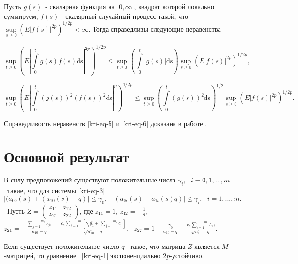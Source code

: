 \begin{lemma}
Пусть  $g(s)$\ {}- скалярная функция на  $[0,\infty [$, квадрат которой локально суммируем,
$f(s)$ {}- скалярный случайный процесс такой, что  $\underset{s\ge 0} \sup \left(E|f(s)|^{2p}\right)^{1/2p} <\infty $. Тогда справедливы следующие неравенства

\begin{equation}\label{kri-eq-5}
	\underset{t\ge 0}\sup\left(E|\overset t{\underset 0{\int
	}}g(s)f(s)\text{ds}|^{2p}\right)^{1/2p}\le \underset{t\ge 0}\sup\left(\overset t{\underset
		0{\int }}|g(s)|\text{ds}\right)\underset{s\ge
		0}\sup\left(E|f(s)|^{2p}\right)^{1/2p},
\end{equation}

\begin{equation}\label{kri-eq-6}
	\underset{t\ge 0}\sup\left(E|\overset t{\underset 0{\int
	}}(g(s))^2(f(s))^2\text{ds}|^p\right)^{1/2p}\le \underset{t\ge 0}\sup\left(\overset
	t{\underset 0{\int }}(g(s))^2\text{ds}\right)^{1/2}\underset{s\ge
		0}\sup\left(E|f(s)|^{2p}\right)^{1/2p}.
\end{equation}
\end{lemma}
Справедливость неравенств \eqref{kri-eq-5} и \eqref{kri-eq-6} доказана в работе \cite{kri-bib-21}.

\section{Основной результат}

В силу предположений существуют положительные числа  $\gamma _i,\text{  }i=0,1,...,m$ \ такие, что для системы \eqref{kri-eq-3}
$|(a_{00}(s)+(a_{10}(s)-q)|\le \gamma _0,\text{  }|(a_{0i}(s)+a_{1i}(s)q)|\le \gamma _i,\text{  }i=1,...,m.$ \ Пусть
$Z=\left(\begin{matrix}z_{11}&z_{12}\\z_{21}&z_{22}\end{matrix}\right)$, где  $z_{11}=1$,  $z_{12}=-\frac 1 q$,
$z_{21}=-\frac{\overset{m_0}{\underset{j=1}{\sum }}c_{\mathit{j0}}}{\overline{a_{10}}-q}-\frac{c_p\overset
m{\underset{i=1}{\sum }}\left[\gamma _i\overline{y_1}+\overset{m_i}{\underset{j=1}{\sum
}}c_{\text{ji}}\right]}{\sqrt{\overline{a_{10}}-q}}$, \  $z_{22}=1-\frac{\gamma
_0}{\overline{a_{10}}-q}-\frac{c_p\overset m{\underset{i=1}{\sum }}A_{1i}}{\sqrt{\overline{a_{10}}-q}}.$

\begin{theorem}
Если существует положительное число  $q$ \ такое, что матрица  $Z$ является  $M${}-матрицей, то
уравнение \ \eqref{kri-eq-1} экспоненциально  $2p${}-устойчиво.
\end{theorem}

